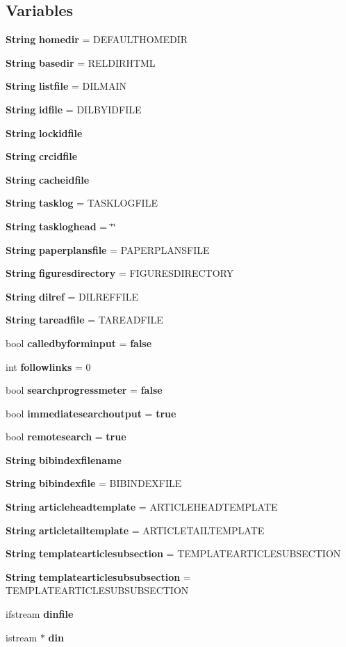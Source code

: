 \subsection*{Variables}
\begin{CompactItemize}
\item 
{\bf String} {\bf homedir} = DEFAULTHOMEDIR
\item 
{\bf String} {\bf basedir} = RELDIRHTML
\item 
{\bf String} {\bf listfile} = DILMAIN
\item 
{\bf String} {\bf idfile} = DILBYIDFILE
\item 
{\bf String} {\bf lockidfile}
\item 
{\bf String} {\bf crcidfile}
\item 
{\bf String} {\bf cacheidfile}
\item 
{\bf String} {\bf tasklog} = TASKLOGFILE
\item 
{\bf String} {\bf taskloghead} = \char`\"{}\char`\"{}
\item 
{\bf String} {\bf paperplansfile} = PAPERPLANSFILE
\item 
{\bf String} {\bf figuresdirectory} = FIGURESDIRECTORY
\item 
{\bf String} {\bf dilref} = DILREFFILE
\item 
{\bf String} {\bf tareadfile} = TAREADFILE
\item 
bool {\bf calledbyforminput} = {\bf false}
\item 
int {\bf followlinks} = 0
\item 
bool {\bf searchprogressmeter} = {\bf false}
\item 
bool {\bf immediatesearchoutput} = {\bf true}
\item 
bool {\bf remotesearch} = {\bf true}
\item 
{\bf String} {\bf bibindexfilename}
\item 
{\bf String} {\bf bibindexfile} = BIBINDEXFILE
\item 
{\bf String} {\bf articleheadtemplate} = ARTICLEHEADTEMPLATE
\item 
{\bf String} {\bf articletailtemplate} = ARTICLETAILTEMPLATE
\item 
{\bf String} {\bf templatearticlesubsection} = TEMPLATEARTICLESUBSECTION
\item 
{\bf String} {\bf templatearticlesubsubsection} = TEMPLATEARTICLESUBSUBSECTION
\item 
ifstream {\bf dinfile}
\item 
istream $\ast$ {\bf din}

\end{CompactItemize}
